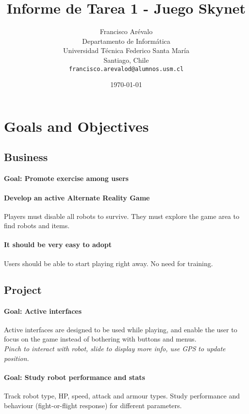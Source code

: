 \documentclass{article}
\begin{document}
\title{Informe de Tarea 1 - Juego Skynet}
\author{Francisco Ar\'evalo\\
  Departamento de Inform\'atica\\
  Universidad T\'ecnica Federico Santa Mar\'ia\\
  Santiago, Chile\\
  \texttt{francisco.arevalod@alumnos.usm.cl}}
\date{\today}
\maketitle
\tableofcontents
\section{Goals and Objectives}
\subsection{Business}
\paragraph{\textbf{Goal}: Promote exercise among users}
\paragraph{Develop an active Alternate Reality Game}
Players must disable all robots to survive. They must explore the game area to find robots and items.
\paragraph{It should be very easy to adopt}
Users should be able to start playing right away. No need for training.
\subsection{Project}
\paragraph{\textbf{Goal}: Active interfaces}
Active interfaces are designed to be used while playing, and enable the user to focus on the game instead of bothering with buttons and menus.\\
\textit{Pinch to interact with robot, slide to display more info, use GPS to update position.}
\paragraph{\textbf{Goal}: Study robot performance and stats}
Track robot type, HP, speed, attack and armour types. Study performance and behaviour (fight-or-flight response) for different parameters.
\end{document}
